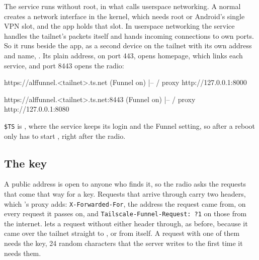 \documentclass[11pt,a4paper]{article}
\begin{document}
The service runs without root, in what  calls userspace networking. A normal  creates a network interface in the kernel, which needs root or Android's single VPN slot, and the app holds that slot. In userspace networking the service handles the tailnet's packets itself and hands incoming connections to  own ports. So it runs beside the app, as a second device on the tailnet with its own address and name, . Its plain address, on port 443, opens  homepage, which links each service, and port 8443 opens the radio:

\begin{cmdout}
https://alffunnel.<tailnet>.ts.net (Funnel on)
|-- / proxy http://127.0.0.1:8000

https://alffunnel.<tailnet>.ts.net:8443 (Funnel on)
|-- / proxy http://127.0.0.1:8080
\end{cmdout}

\texttt{\$TS} is , where the service keeps its login and the Funnel setting, so after a reboot  only has to start , right after the radio.

\subsection*{The key}

A public address is open to anyone who finds it, so the radio asks the requests that come that way for a key. Requests that arrive through  carry two headers, which 's proxy adds: \texttt{X-Forwarded-For}, the address the request came from, on every request it passes on, and \texttt{Tailscale-Funnel-Request: ?1} on those from the internet.  lets a request without either header through, as before, because it came over the tailnet straight to , or from  itself. A request with one of them needs the key, 24 random characters that the server writes to  the first time it needs them.
\end{document}
